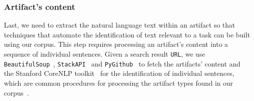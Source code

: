 

\subsubsection{Artifact's content}

Last, we need to extract the natural language text within an artifact so that 
techniques that automate the identification of text relevant to a task can be built 
using our corpus.  This step requires processing an artifact's content 
into a sequence of individual sentences.
Given a search result \texttt{URL}, we use \texttt{BeautifulSoup}~\cite{beautifulsoup4},
\texttt{StackAPI}~\cite{StackAPI} and \texttt{PyGithub}~\cite{PyGithub}
to fetch the artifacts' content
and the Stanford CoreNLP toolkit~\cite{CoreNLP} for the identification of 
individual sentences,
which are common procedures for processing the artifact types found in our corpus~\cite{Arya2019, nadi2020}.








